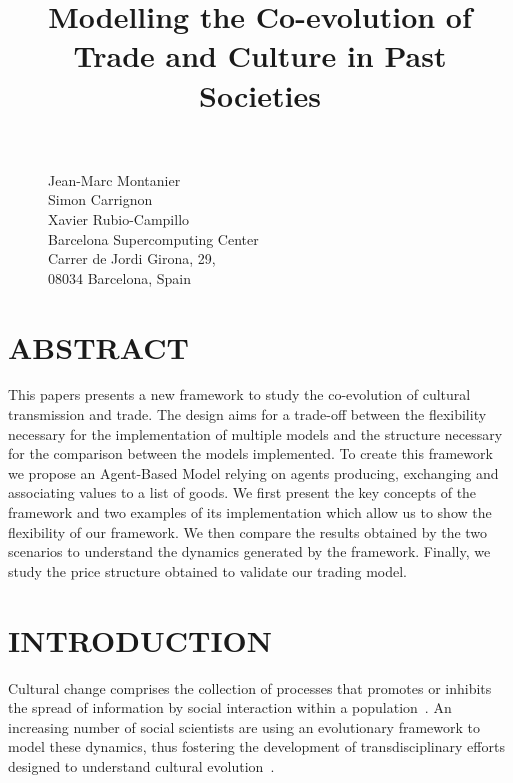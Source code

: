 \documentclass{wscpaperproc}
\begin{document}

\title{Modelling the Co-evolution of Trade and Culture in Past Societies}

\maketitle

\begin{figure}[htb]
{
\centering
Jean-Marc Montanier\\
Simon Carrignon\\ 
Xavier Rubio-Campillo\\
\vspace{12pt}
Barcelona Supercomputing Center\\
Carrer de Jordi Girona, 29, \\
08034 Barcelona, Spain\\
}
\end{figure}


\section*{ABSTRACT}

This papers presents a new framework to study the co-evolution of cultural transmission and trade. The design aims for a trade-off between the flexibility necessary for the implementation of multiple models and the structure necessary for the comparison between the models implemented. To create this framework we propose an Agent-Based Model relying on agents producing, exchanging and associating values to a list of goods. We first present the key concepts of the framework and two examples of its implementation which allow us to show the flexibility of our framework. We then compare the results obtained by the two scenarios to understand the dynamics generated by the framework. Finally, we study the price structure obtained to validate our trading model.


\section{INTRODUCTION}\label{sec:intro}


Cultural change comprises the collection of processes that promotes or inhibits the spread of information by social interaction within a population~\cite{boyd_origin_2005}. An increasing number of social scientists are using an evolutionary framework to model these dynamics, thus fostering the development of transdisciplinary efforts designed to understand cultural evolution~\cite{henrich_evolution_2003}.
\end{document}
